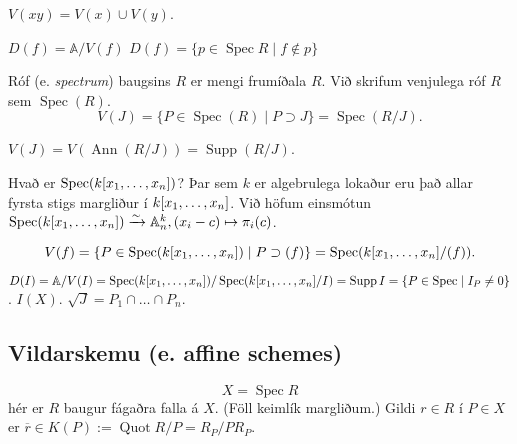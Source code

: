 \documentclass[a4paper, 14pt]{article}
\DeclareMathOperator{\Spec}{Spec}
\DeclareMathOperator{\Ann}{Ann}
\DeclareMathOperator{\Supp}{Supp}
\DeclareMathOperator{\Quot}{Quot}
\newcommand{\A}{\mathbb{A}}
\begin{document}
$V(xy) = V(x) \cup V(y)$. 

$D(f) = \A / V(f)$
$D(f) = \{ p \in \Spec R \mid f \not\in p \}$

Róf (e. \emph{spectrum}) baugsins $R$ er mengi frumíðala $R$. Við skrifum venjulega róf $R$ sem $\Spec(R)$. 
\[
    V(J) = \{ P \in \Spec(R) \mid P \supset J \} = \Spec(R/J).
\]

$V(J) = V(\Ann(R/J)) = \Supp(R/J)$.

Hvað er $\Spec(k[\xs])$?
Þar sem $k$ er algebrulega lokaður eru það allar fyrsta stigs margliður í $k[\xs]$. Við höfum 
einsmótun $ \Spec(k[\xs]) \xrightarrow{\sim} \A_n^k, (x_i - c) \mapsto \pi_i(c) $.

\[
    V(f) = \{ P \in \Spec(k[\xs]) \mid P \supset (f) \} = \Spec(k[\xs]/(f)).
\]

$D(I) = \A / V(I) = \Spec(k[\xs]) / \Spec(k[\xs]/I) = \Supp I = \{ P \in \Spec \mid I_P \neq 0 \}$. $I(X)$. $\sqrt{J} = P_1 \cap \dots \cap P_n$.

\subsection{Vildarskemu (e. affine schemes)}
\[
    X = \Spec R
\]
hér er $R$ baugur fágaðra falla á $X$. (Föll keimlík margliðum.)
Gildi $r \in R$ í $P \in X$ er $\overline{r} \in K(P) := \Quot R/P = R_P/PR_P$.
\end{document}

